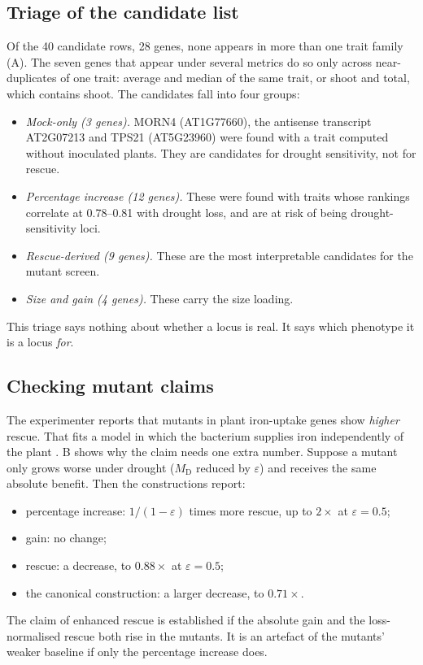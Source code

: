 \documentclass[10pt,twocolumn,a4paper]{article}
\theoremstyle{definition}
\theoremstyle{remark}
\newcommand{\MD}{{M_{\mathrm D}}}
\begin{document}
\subsection{Triage of the candidate list}

Of the 40 candidate rows, 28 genes, none appears in more than one trait
family (A). The seven genes that appear under several
metrics do so only across near-duplicates of one trait: average and
median of the same trait, or shoot and total, which contains shoot. The
candidates fall into four groups:
\begin{itemize}[leftmargin=1.3em,itemsep=1pt]
  \item \emph{Mock-only (3 genes).} MORN4 (AT1G77660), the antisense
  transcript AT2G07213 and TPS21 (AT5G23960) were found with a trait
  computed without inoculated plants. They are candidates for drought
  sensitivity, not for rescue.
  \item \emph{Percentage increase (12 genes).} These were found with
  traits whose rankings correlate at 0.78--0.81 with drought loss, and
  are at risk of being drought-sensitivity loci.
  \item \emph{Rescue-derived (9 genes).} These are the most interpretable
  candidates for the mutant screen.
  \item \emph{Size and gain (4 genes).} These carry the size loading.
\end{itemize}
This triage says nothing about whether a locus is real. It says which
phenotype it is a locus \emph{for}.

\subsection{Checking mutant claims}

The experimenter reports that mutants in plant iron-uptake genes show
\emph{higher} rescue. That fits a model in which the bacterium supplies
iron independently of the plant \citep{zamioudis2015,verbon2017}.
B shows why the claim needs one extra number. Suppose a
mutant only grows worse under drought ($\MD$ reduced by $\varepsilon$)
and receives the same absolute benefit. Then the constructions report:
\begin{itemize}[leftmargin=1.3em,itemsep=1pt]
  \item percentage increase: $1/(1-\varepsilon)$ times more rescue, up to
  $2\times$ at $\varepsilon=0.5$;
  \item gain: no change;
  \item rescue: a decrease, to $0.88\times$ at $\varepsilon=0.5$;
  \item the canonical construction: a larger decrease, to $0.71\times$.
\end{itemize}
The claim of enhanced rescue is established if the absolute gain and the
loss-normalised rescue both rise in the mutants. It is an artefact of the
mutants' weaker baseline if only the percentage increase does.
\end{document}
